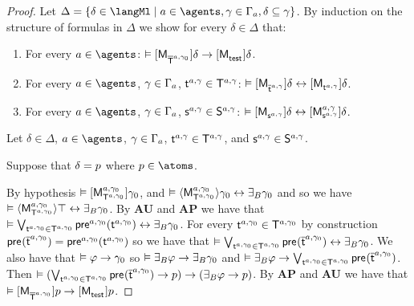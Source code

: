 \begin{proof}
Let $\Delta = \{\delta \in \langMl \mid \agentA \in \agents, \gamma \in \Gamma_\agentA, \delta \subseteq \gamma\}$.
By induction on the structure of formulas in $\Delta$ we show for every $\delta \in \Delta$ that:

\begin{enumerate}
    \item For every $\agentA \in \agents$: $\entails \actionA{\aPModel{\aPStatesT[\agentA, \gamma_0]}} \delta \implies \actionA{\aPModel{\aStateTest}} \delta$.
    \item For every $\agentA \in \agents$, $\gamma \in \Gamma_\agentA$, $\aStateT[\agentA, \gamma] \in \aStatesT[\agentA, \gamma]$: $\entails \actionA{\aPModel{\aPStateT[\agentA, \gamma]}} \delta \iff \actionA{\aPModel{\aStateT[\agentA, \gamma]}} \delta$.
    \item For every $\agentA \in \agents$, $\gamma \in \Gamma_\agentA$, $\aStateS[\agentA, \gamma] \in \aStates[\agentA, \gamma]$: $\entails \actionA{\aPModel{\aStateS[\agentA, \gamma]}} \delta \iff \actionA{\aPModel[\agentA, \gamma]{\aStateS[\agentA, \gamma]}} \delta$.
\end{enumerate}

Let $\delta \in \Delta$, $\agentA \in \agents$, $\gamma \in \Gamma_\agentA$, $\aStateT[\agentA, \gamma] \in \aStatesT[\agentA, \gamma]$, and $\aStateS[\agentA, \gamma] \in \aStates[\agentA, \gamma]$.

Suppose that $\delta = \atomP$ where $\atomP \in \atoms$.

By hypothesis $\entails \actionA{\aPModel[\agentA, \gamma_0]{\aStatesT[\agentA, \gamma_0]}} \gamma_0$, and $\entails \actionE{\aPModel[\agentA, \gamma_0]{\aStatesT[\agentA, \gamma_0]}} \gamma_0 \iff \someactsBs \gamma_0$ and so we have $\entails \actionE{\aPModel[\agentA, \gamma_0]{\aStatesT[\agentA, \gamma_0]}} \top \iff \someactsBs \gamma_0$.
By {\bf AU} and {\bf AP} we have that $\entails \bigvee_{\aStateT[\agentA, \gamma_0] \in \aStatesT[\agentA, \gamma_0]} \aPrecondition[\agentA, \gamma_0](\aStateT[\agentA, \gamma_0]) \iff \someactsBs \gamma_0$.
For every $\aStateT[\agentA, \gamma_0] \in \aStatesT[\agentA, \gamma_0]$ by construction $\aPrecondition(\aPStateT[\agentA, \gamma_0]) = \aPrecondition[\agentA, \gamma_0](\aStateT[\agentA, \gamma_0])$ so we have that $\entails \bigvee_{\aStateT[\agentA, \gamma_0] \in \aStatesT[\agentA, \gamma_0]} \aPrecondition(\aPStateT[\agentA, \gamma_0]) \iff \someactsBs \gamma_0$.
We also have that $\entails \phi \implies \gamma_0$ so $\entails \someactsBs \phi \implies \someactsBs \gamma_0$ and $\entails \someactsBs \phi \implies \bigvee_{\aStateT[\agentA, \gamma_0] \in \aStatesT[\agentA, \gamma_0]} \aPrecondition(\aPStateT[\agentA, \gamma_0])$.
Then $\entails (\bigvee_{\aStateT[\agentA, \gamma_0] \in \aStatesT[\agentA, \gamma_0]} \aPrecondition(\aPStateT[\agentA, \gamma_0]) \implies \atomP) \implies (\someactsBs \phi \implies \atomP)$.
By {\bf AP} and {\bf AU} we have that $\entails \actionA{\aPModel{\aPStatesT[\agentA, \gamma_0]}} \atomP \implies \actionA{\aPModel{\aStateTest}} \atomP $.


\end{proof}
